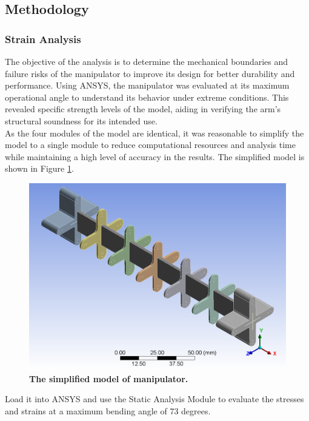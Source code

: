 \subsection{Methodology}
\subsubsection{Strain Analysis}
The objective of the analysis is to determine the mechanical boundaries and failure risks of the manipulator to 
improve its design for better durability and performance. Using ANSYS, the manipulator was evaluated at its maximum 
operational angle to understand its behavior under extreme conditions. This revealed specific strength levels of the 
model, aiding in verifying the arm's structural soundness for its intended use. \\
As the four modules of the model are identical, it was reasonable to simplify the model to a single module to 
reduce computational resources and analysis time while maintaining a high level of accuracy in the results. The 
simplified model is shown in Figure \ref{fig:sim_model}.
\begin{figure}[H] %
    \centering
    \captionsetup{labelsep=colon}
    \includegraphics[width=1.0\textwidth]{Image/Design/model.png} 
    \caption[The simplified model of manipulator]
    {\centering \textbf{The simplified model of manipulator.}}
    \label{fig:sim_model}
\end{figure}
Load it into ANSYS and use the Static Analysis Module to evaluate the stresses and strains at a maximum bending 
angle of 73 degrees. \\
